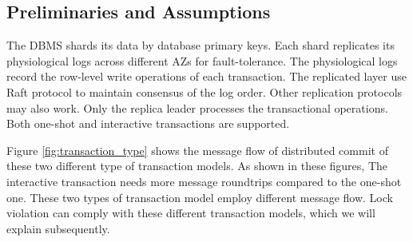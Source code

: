 \documentclass[conference]{IEEEtran}
\begin{document}
\subsection{Preliminaries and Assumptions}
The DBMS shards its data by database primary keys.
Each shard replicates its physiological logs across different AZs for fault-tolerance.
The physiological logs record the row-level write operations of each transaction.
The replicated layer use Raft protocol to maintain consensus of the log order. 
Other replication protocols may also work.
Only the replica leader processes the transactional operations.
Both one-shot and interactive transactions are supported.

Figure \ref{fig:transaction_type} shows the message flow of distributed commit of these two different type of transaction models.
As shown in these figures, The interactive transaction needs more message roundtrips compared to the one-shot one.
These two types of transaction model employ different message flow.
Lock violation can comply with these different transaction models, which we will explain subsequently.
\end{document}
